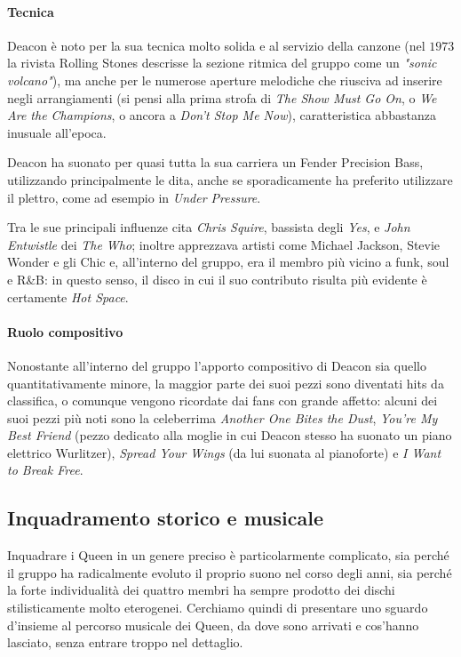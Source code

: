 \documentclass[12pt]{article}
\begin{document}
\paragraph{Tecnica}\label{par:jdtech}
Deacon è noto per la sua tecnica molto solida e al servizio della canzone (nel \(1973\) la rivista Rolling Stones descrisse la sezione ritmica del gruppo come un \emph{"sonic volcano"}), ma anche per le numerose aperture melodiche che riusciva ad inserire negli arrangiamenti (si pensi alla prima strofa di \emph{The Show Must Go On}, o \emph{We Are the Champions}, o ancora a \emph{Don't Stop Me Now}), caratteristica abbastanza inusuale all'epoca.

Deacon ha suonato per quasi tutta la sua carriera un Fender Precision Bass, utilizzando principalmente le dita, anche se sporadicamente ha preferito utilizzare il plettro, come ad esempio in \emph{Under Pressure}.

Tra le sue principali influenze cita \emph{Chris Squire}, bassista degli \emph{Yes}, e \emph{John Entwistle} dei \emph{The Who}; inoltre apprezzava artisti come Michael Jackson, Stevie Wonder e gli Chic e, all'interno del gruppo, era il membro più vicino a funk, soul e R\&B: in questo senso, il disco in cui il suo contributo risulta più evidente è certamente \emph{Hot Space}.

\paragraph{Ruolo compositivo} Nonostante all'interno del gruppo l'apporto compositivo di Deacon sia quello quantitativamente minore, la maggior parte dei suoi pezzi sono diventati hits da classifica, o comunque vengono ricordate dai fans con grande affetto: alcuni dei suoi pezzi più noti sono la celeberrima \emph{Another One Bites the Dust}, \emph{You're My Best Friend} (pezzo dedicato alla moglie in cui Deacon stesso ha suonato un piano elettrico Wurlitzer), \emph{Spread Your Wings} (da lui suonata al pianoforte) e \emph{I Want to Break Free}.

\subsection{Inquadramento storico e musicale}\label{subsec:style}
Inquadrare i Queen in un genere preciso è particolarmente complicato, sia perché il gruppo ha radicalmente evoluto il proprio suono nel corso degli anni, sia perché la forte individualità dei quattro membri ha sempre prodotto dei dischi stilisticamente molto eterogenei. Cerchiamo quindi di presentare uno sguardo d'insieme al percorso musicale dei Queen, da dove sono arrivati e cos'hanno lasciato, senza entrare troppo nel dettaglio.
\end{document}
